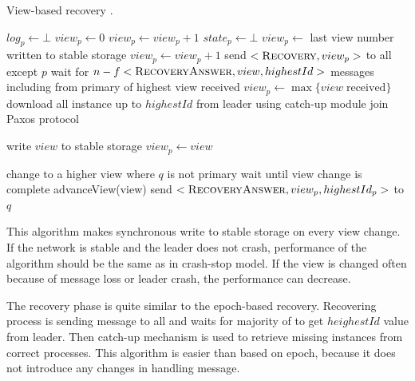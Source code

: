\begin{algorithm}
  \caption{View-based recovery \protect\cite{Nun10}.}
  \begin{algorithmic}[1]
    \INIT{}
      \STATE $log_p \leftarrow \bot$
      \STATE $view_p \leftarrow 0$
        \STATE $view_p \leftarrow view_p + 1$
      \ENDIF
      \STATE $state_p \leftarrow \bot$
      \STATE
        \STATE $view_p \leftarrow$ last view number written to stable storage
          \STATE $view_p \leftarrow view_p + 1$
        \ENDIF
        \STATE send $<\recovery[], view_p>$ to all except $p$
        \STATE wait for $n-f <\recoveryAnswer[], view, highestId>$ messages including from primary of highest view received
        \STATE $view_p \leftarrow \max\{{ view \; \mathrm{received}}\}$
        \STATE download all instance up to $highestId$ from leader using catch-up module
      \ENDIF
      \STATE
      \STATE join Paxos protocol
    \ENDINIT

    \vspace{1em}
      \STATE write $view$ to stable storage
      \STATE $view_p \leftarrow view$
    \ENDPROC

    \vspace{1em}
        \STATE change to a higher view where $q$ is not primary
        \STATE wait until view change is complete
      \ENDIF
        \STATE advanceView(view)
      \ENDIF
      \STATE send $<\recoveryAnswer[], view_p, highestId_p>$ to $q$
    \ENDUPON
  \end{algorithmic}
\end{algorithm}

This algorithm makes synchronous write to stable storage on every view change. \linebreak If the network is stable and the leader does not crash, performance of the algorithm should be the same as in crash-stop model. If the view is changed often because of message loss or leader crash, the performance can decrease.

The recovery phase is quite similar to the epoch-based recovery. Recovering process is sending \recovery message to all and waits for majority of \recoveryAnswer to get $heighestId$ value from leader. Then catch-up mechanism is used to retrieve missing instances from correct processes. This algorithm is easier than based on epoch, because it does not introduce any changes in handling \prepareOK message.

